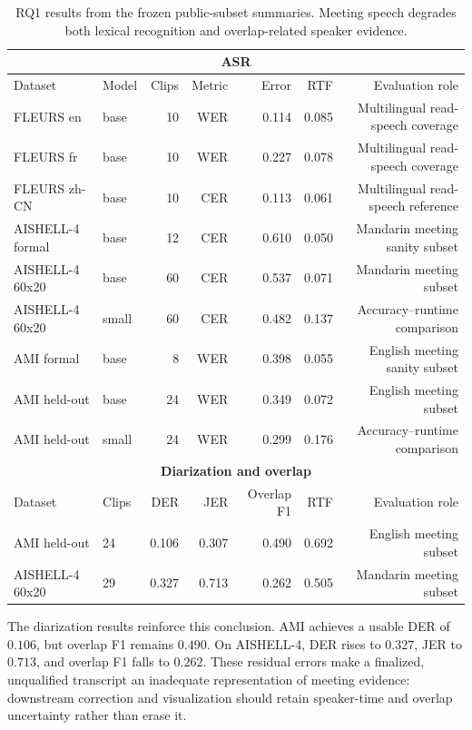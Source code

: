 \documentclass[10pt,twocolumn]{article}
\begin{document}
\begin{table}[t]
\centering
\scriptsize
\begin{tabular}{llrrrrr}
\toprule
\multicolumn{7}{c}{\textbf{ASR}} \\
\midrule
Dataset & Model & Clips & Metric & Error & RTF & Evaluation role \\
\midrule
FLEURS en & base & 10 & WER & 0.114 & 0.085 & Multilingual read-speech coverage \\
FLEURS fr & base & 10 & WER & 0.227 & 0.078 & Multilingual read-speech coverage \\
FLEURS zh-CN & base & 10 & CER & 0.113 & 0.061 & Multilingual read-speech reference \\
AISHELL-4 formal & base & 12 & CER & 0.610 & 0.050 & Mandarin meeting sanity subset \\
AISHELL-4 60x20 & base & 60 & CER & 0.537 & 0.071 & Mandarin meeting subset \\
AISHELL-4 60x20 & small & 60 & CER & 0.482 & 0.137 & Accuracy--runtime comparison \\
AMI formal & base & 8 & WER & 0.398 & 0.055 & English meeting sanity subset \\
AMI held-out & base & 24 & WER & 0.349 & 0.072 & English meeting subset \\
AMI held-out & small & 24 & WER & 0.299 & 0.176 & Accuracy--runtime comparison \\
\midrule
\multicolumn{7}{c}{\textbf{Diarization and overlap}} \\
\midrule
Dataset & Clips & DER & JER & Overlap F1 & RTF & Evaluation role \\
\midrule
AMI held-out & 24 & 0.106 & 0.307 & 0.490 & 0.692 & English meeting subset \\
AISHELL-4 60x20 & 29 & 0.327 & 0.713 & 0.262 & 0.505 & Mandarin meeting subset \\
\bottomrule
\end{tabular}
\caption{RQ1 results from the frozen public-subset summaries. Meeting speech degrades both lexical recognition and overlap-related speaker evidence.}
\label{tab:rq1}
\end{table}

The diarization results reinforce this conclusion. AMI achieves a usable DER of \(0.106\), but overlap F1 remains \(0.490\). On AISHELL-4, DER rises to \(0.327\), JER to \(0.713\), and overlap F1 falls to \(0.262\). These residual errors make a finalized, unqualified transcript an inadequate representation of meeting evidence: downstream correction and visualization should retain speaker-time and overlap uncertainty rather than erase it.
\end{document}
